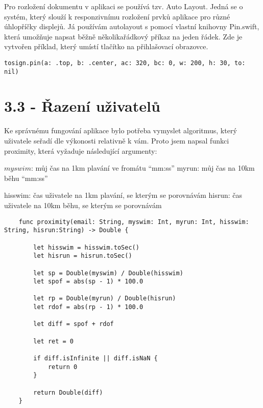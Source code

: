 \documentclass{article}
\begin{document}
Pro rozložení dokumentu v aplikaci se používá tzv. Auto Layout. Jedná se o systém, který slouží k responzivnímu rozložení prvků aplikace pro různé úhlopříčky displejů. 
Já používám autolayout s pomocí vlastní knihovny Pin.swift, která umožňuje napsat běžně několikařádkový příkaz na jeden řádek. Zde je vytvořen příklad, který umístí tlačítko na přihlašovací obrazovce.



\vspace{10 mm}
\begin{verbatim}
tosign.pin(a: .top, b: .center, ac: 320, bc: 0, w: 200, h: 30, to: nil)
\end{verbatim}


\vspace{10 mm}
\section{3.3 - Řazení uživatelů}

Ke správnému fungování aplikace bylo potřeba vymyslet algoritmus, který uživatele seřadí dle výkonosti relativně k vám. Proto jsem napsal funkci proximity, která vyžaduje následující argumenty:

$myswim$: můj čas na 1km plavání ve fromátu “mm:ss”
myrun: můj čas na 10km běhu “mm:ss”

hisswim: čas uživatele na 1km plavání, se kterým se porovnávám 
hisrun: čas uživatele na 10km běhu, se kterým se porovnávám 



\vspace{10 mm}
  \begin{verbatim}
    func proximity(email: String, myswim: Int, myrun: Int, hisswim: String, hisrun:String) -> Double {
        
        let hisswim = hisswim.toSec()
        let hisrun = hisrun.toSec()
        
        let sp = Double(myswim) / Double(hisswim)       
        let spof = abs(sp - 1) * 100.0
        
        let rp = Double(myrun) / Double(hisrun)
        let rdof = abs(rp - 1) * 100.0
        
        let diff = spof + rdof
        
        let ret = 0
        
        if diff.isInfinite || diff.isNaN {
            return 0
        }
        
        return Double(diff)
    }
 \end{verbatim}
\end{document}
